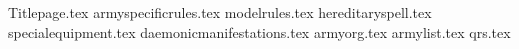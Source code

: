 \documentclass[a4paper,10pt]{article}
\begin{document}
{Titlepage.tex}
\fluffbox{\fluffone}
\additionalspacebeforemaintitle{}
{armyspecificrules.tex}
\additionalspacebeforemaintitle{}
\fluffbox{\flufftwo}
\newpage
{modelrules.tex}
\newpage
\fluffbox{\fluffthree}
\additionalspacebeforemaintitle{}
{hereditaryspell.tex}
\newpage
{specialequipment.tex}
\fluffbox{\flufffour}
\newpage
{daemonicmanifestations.tex}
\newpage
{armyorg.tex}
\additionalspacebeforemaintitle{}
{armylist.tex}
\newpage
{qrs.tex}
\end{document}
